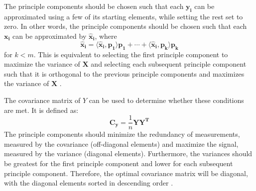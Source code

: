 \documentclass[conference]{IEEEtran}
\begin{document}
    	The principle components should be chosen such that each $\mathbf{y_i}$ can be approximated using a few of its starting elements, while setting the rest set to zero. In other words, the principle components should be chosen such that each $\mathbf{x_i}$ can be approximated by $\mathbf{\hat{x}_i}$, where 
    	\begin{equation}
 		\mathbf{\hat{x}_i} = \langle \mathbf{\hat{x}_i}, \mathbf{p_1} \rangle \mathbf{p_1} + \cdots + \langle \mathbf{\hat{x}_i}, \mathbf{p_k} \rangle \mathbf{p_k}
 	\end{equation}   	
    	for $k < m$. This is equivalent to selecting the first principle component to maximize the variance of $\mathbf{X}$ and selecting each subsequent principle component such that it is orthogonal to the previous principle components and maximizes the variance of $\mathbf{X}$ \cite{shlens_2014_tutorial}.
    	
    	The covariance matrix of $Y$ can be used to determine whether these conditions are met. It is defined as:
	\begin{equation}
		\mathbf{C_y} = \frac{1}{n}{\mathbf{YY^T}}
	\end{equation} 
	The principle components should minimize the redundancy of measurements, measured by the covariance (off-diagonal elements) and maximize the signal, measured by the variance (diagonal elements). Furthermore, the variances should be greatest for the first principle component and lower for each subsequent principle component. Therefore, the optimal covariance matrix will be diagonal, with the diagonal elements sorted in descending order \cite{shlens_2014_tutorial}.
	
    	
\end{document}
